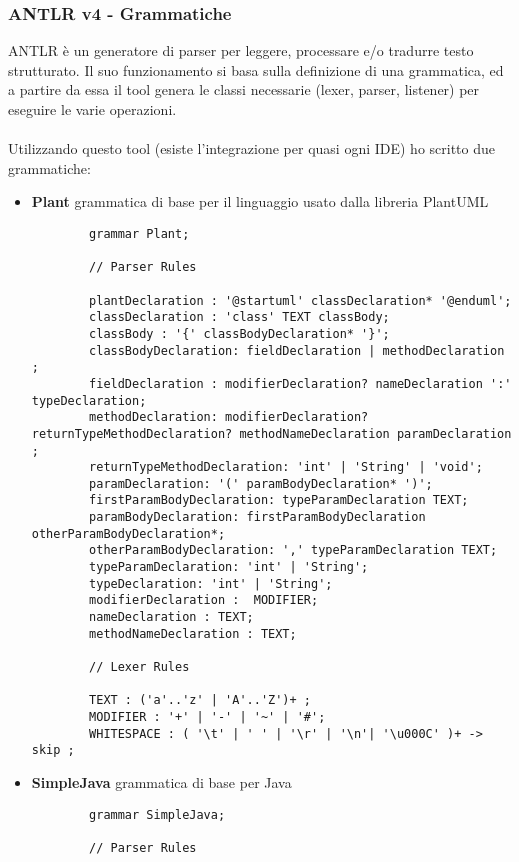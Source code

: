 \documentclass{article}
\begin{document}
  \subsubsection{ANTLR v4 - Grammatiche}
  ANTLR è un generatore di parser per leggere, processare e/o tradurre testo strutturato. Il suo funzionamento si basa sulla definizione di una grammatica, ed a partire
  da essa il tool genera le classi necessarie (lexer, parser, listener) per eseguire le varie operazioni.\\
  \\Utilizzando questo tool (esiste l'integrazione per quasi ogni IDE) ho scritto due grammatiche:
  \begin{itemize}
    \item \textbf{Plant} grammatica di base per il linguaggio usato dalla libreria PlantUML
      \begin{lstlisting}
        grammar Plant;

        // Parser Rules

        plantDeclaration : '@startuml' classDeclaration* '@enduml';
        classDeclaration : 'class' TEXT classBody;
        classBody : '{' classBodyDeclaration* '}';
        classBodyDeclaration: fieldDeclaration | methodDeclaration ;
        fieldDeclaration : modifierDeclaration? nameDeclaration ':' typeDeclaration;
        methodDeclaration: modifierDeclaration? returnTypeMethodDeclaration? methodNameDeclaration paramDeclaration  ;
        returnTypeMethodDeclaration: 'int' | 'String' | 'void';
        paramDeclaration: '(' paramBodyDeclaration* ')';
        firstParamBodyDeclaration: typeParamDeclaration TEXT;
        paramBodyDeclaration: firstParamBodyDeclaration otherParamBodyDeclaration*;
        otherParamBodyDeclaration: ',' typeParamDeclaration TEXT;
        typeParamDeclaration: 'int' | 'String';
        typeDeclaration: 'int' | 'String';
        modifierDeclaration :  MODIFIER;
        nameDeclaration : TEXT;
        methodNameDeclaration : TEXT;

        // Lexer Rules

        TEXT : ('a'..'z' | 'A'..'Z')+ ;
        MODIFIER : '+' | '-' | '~' | '#';
        WHITESPACE : ( '\t' | ' ' | '\r' | '\n'| '\u000C' )+ -> skip ;
      \end{lstlisting}
    \item \textbf{SimpleJava} grammatica di base per Java
      \begin{lstlisting}
        grammar SimpleJava;

        // Parser Rules


\end{lstlisting}
\end{itemize}
\end{document}

